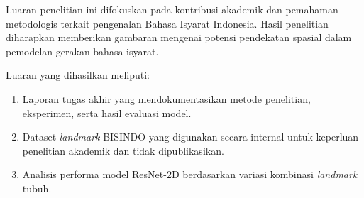Luaran penelitian ini difokuskan pada kontribusi akademik dan pemahaman metodologis terkait pengenalan Bahasa Isyarat Indonesia.  
Hasil penelitian diharapkan memberikan gambaran mengenai potensi pendekatan spasial dalam pemodelan gerakan bahasa isyarat.  

Luaran yang dihasilkan meliputi:  
\begin{enumerate}[noitemsep]
    \item Laporan tugas akhir yang mendokumentasikan metode penelitian, eksperimen, serta hasil evaluasi model.  
    \item Dataset \textit{landmark} BISINDO yang digunakan secara internal untuk keperluan penelitian akademik dan tidak dipublikasikan.  
    \item Analisis performa model ResNet-2D berdasarkan variasi kombinasi \textit{landmark} tubuh.  
\end{enumerate}